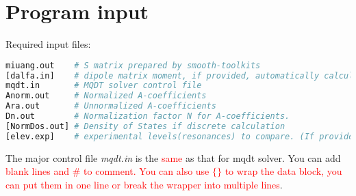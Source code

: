 \documentclass[11pt]{article}
\begin{document}
\section{\label{sec:input}Program input}
Required input files:
\begin{lstlisting}[language=bash]
miuang.out    # S matrix prepared by smooth-toolkits
[dalfa.in]    # dipole matrix moment, if provided, automatically calculate oscillator strength (density)
mqdt.in       # MQDT solver control file 
Anorm.out     # Normalized A-coefficients
Ara.out       # Unnormalized A-coefficients                
Dn.out        # Normalization factor N for A-coefficients.
[NormDos.out] # Density of States if discrete calculation  
[elev.exp]    # experimental levels(resonances) to compare. (If provided, the program will generate comparison files automatically.)                    
\end{lstlisting}

The major control file \emph{mqdt.in} is the \textcolor{red}{same} as that for mqdt solver. You can add \textcolor{red}{blank lines and $\#$ to comment. You can also use $\{\}$ to wrap the data block, you can put them in one line or break the wrapper into multiple lines}. 
\end{document}
